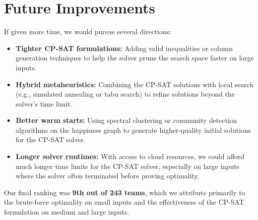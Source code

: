 \documentclass[11pt]{article}
\begin{document}
\section*{Future Improvements}

If given more time, we would pursue several directions:

\begin{itemize}[nosep]
    \item \textbf{Tighter CP-SAT formulations:} Adding valid inequalities or column generation techniques to help the solver prune the search space faster on large inputs.
    \item \textbf{Hybrid metaheuristics:} Combining the CP-SAT solutions with local search (e.g., simulated annealing or tabu search) to refine solutions beyond the solver's time limit.
    \item \textbf{Better warm starts:} Using spectral clustering or community detection algorithms on the happiness graph to generate higher-quality initial solutions for the CP-SAT solver.
    \item \textbf{Longer solver runtimes:} With access to cloud resources, we could afford much longer time limits for the CP-SAT solver, especially on large inputs where the solver often terminated before proving optimality.
\end{itemize}

Our final ranking was \textbf{9th out of 243 teams}, which we attribute primarily to the brute-force optimality on small inputs and the effectiveness of the CP-SAT formulation on medium and large inputs.
\end{document}
